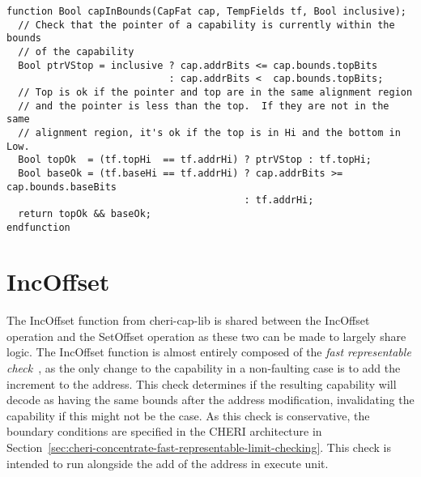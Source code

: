 \begin{lstlisting}[language=bluespec]
function Bool capInBounds(CapFat cap, TempFields tf, Bool inclusive);
  // Check that the pointer of a capability is currently within the bounds
  // of the capability
  Bool ptrVStop = inclusive ? cap.addrBits <= cap.bounds.topBits
                            : cap.addrBits <  cap.bounds.topBits;
  // Top is ok if the pointer and top are in the same alignment region
  // and the pointer is less than the top.  If they are not in the same
  // alignment region, it's ok if the top is in Hi and the bottom in Low.
  Bool topOk  = (tf.topHi  == tf.addrHi) ? ptrVStop : tf.topHi;
  Bool baseOk = (tf.baseHi == tf.addrHi) ? cap.addrBits >= cap.bounds.baseBits
                                         : tf.addrHi;
  return topOk && baseOk;
endfunction
\end{lstlisting}

\section{IncOffset}
\label{sec:cheri-128-listings-incoffset}

The IncOffset function from cheri-cap-lib is shared between the IncOffset operation and the SetOffset operation as these two can be made to largely share logic.
The IncOffset function is almost entirely composed of the \emph{fast representable check}~\cite{Woodruff2019}, as the only change to the capability in a non-faulting case is to add the increment to the address.
This check determines if the resulting capability will decode as having the same bounds after the address modification, invalidating the capability if this might not be the case.
As this check is conservative, the boundary conditions are specified in the CHERI architecture in Section~\ref{sec:cheri-concentrate-fast-representable-limit-checking}.
This check is intended to run alongside the add of the address in execute unit.


